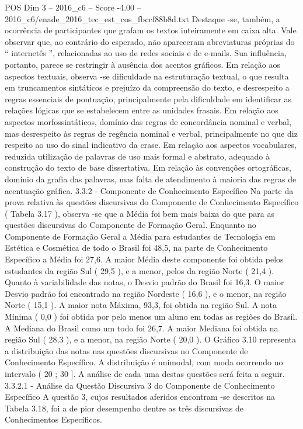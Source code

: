 \begin{textsample}{POS Dim 3 – 2016\_c6 – Score -4.00 – 2016\_c6/enade\_2016\_tec\_est\_cos\_fbccf88b8d.txt}
Destaque -se, também, a ocorrência de participantes que grafam os textos inteiramente em caixa alta.
Vale observar que, ao contrário do esperado, não apareceram abreviaturas próprias do “ internetês ”, relacionadas ao uso de redes sociais e de e-mails.
Sua influência, portanto, parece se restringir à ausência dos acentos gráficos.
Em relação aos aspectos textuais, observa -se dificuldade na estruturação textual, o que resulta em truncamentos sintáticos e prejuízo da compreensão do texto, e desrespeito a regras essenciais de pontuação, principalmente pela dificuldade em identificar as relações lógicas que se estabelecem entre as unidades frasais.
Em relação aos aspectos morfossintáticos, domínio das regras de concordância nominal e verbal, mas desrespeito às regras de regência nominal e verbal, principalmente no que diz respeito ao uso do sinal indicativo da crase.
Em relação aos aspectos vocabulares, reduzida utilização de palavras de uso mais formal e abstrato, adequado à construção do texto de base dissertativa.
Em relação às convenções ortográficas, domínio da grafia das palavras, mas falta de atendimento à maioria das regras de acentuação gráfica. 3.3.2 - Componente de Conhecimento Específico Na parte da prova relativa às questões discursivas do Componente de Conhecimento Específico ( Tabela 3.17 ), observa -se que a Média foi bem mais baixa do que para as questões discursivas do Componente de Formação Geral.
Enquanto no Componente de Formação Geral a Média para estudantes de Tecnologia em Estética e Cosmética de todo o Brasil foi 48,5, na parte de Conhecimento Específico a Média foi 27,6.
A maior Média deste componente foi obtida pelos estudantes da região Sul ( 29,5 ), e a menor, pelos da região Norte ( 21,4 ).
Quanto à variabilidade das notas, o Desvio padrão do Brasil foi 16,3.
O maior Desvio padrão foi encontrado na região Nordeste ( 16,6 ), e o menor, na região Norte ( 15,1 ).
A maior nota Máxima, 93,3, foi obtida na região Sul.
A nota Mínima ( 0,0 ) foi obtida por pelo menos um aluno em todas as regiões do Brasil.
A Mediana do Brasil como um todo foi 26,7.
A maior Mediana foi obtida na região Sul ( 28,3 ), e a menor, na região Norte ( 20,0 ).
O Gráfico 3.10 representa a distribuição das notas nas questões discursivas no Componente de Conhecimento Específico.
A distribuição é unimodal, com moda ocorrendo no intervalo ( 20 ; 30 ].
A análise de cada uma destas questões será feita a seguir. 3.3.2.1 - Análise da Questão Discursiva 3 do Componente de Conhecimento Específico A questão 3, cujos resultados aferidos encontram -se descritos na Tabela 3.18, foi a de pior desempenho dentre as três discursivas de Conhecimentos Específicos.

\end{textsample}
